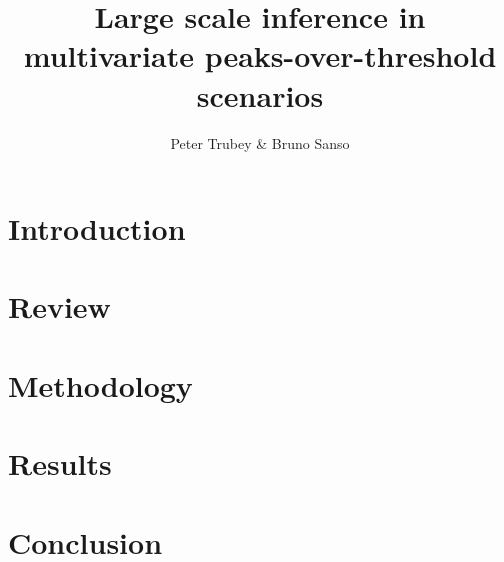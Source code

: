 \documentclass{article}
\title{Large scale inference in multivariate peaks-over-threshold scenarios}
\author{Peter Trubey \& Bruno Sanso}
\begin{document}
\maketitle

\begin{abstract}
    
\end{abstract}

\section{Introduction}


\section{Review}


\section{Methodology}


\section{Results}


\section{Conclusion}

\end{document}
